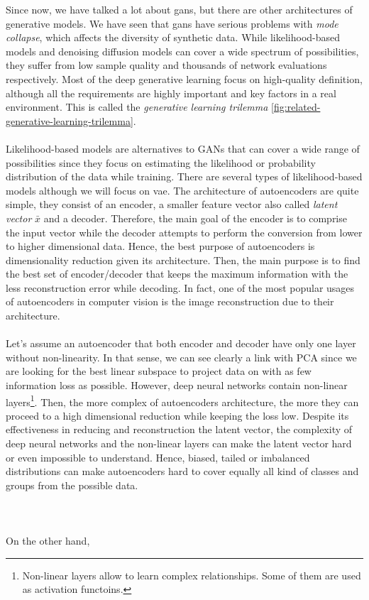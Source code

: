 \documentclass[11pt, a4paper]{article}
\begin{document}
	Since now, we have talked a lot about \gls{gan}s, but there are other architectures of generative models. We have seen that \gls{gan}s have serious problems with \textit{mode collapse}, which affects the diversity of synthetic data. While likelihood-based models and denoising diffusion models can cover a wide spectrum of possibilities, they suffer from low sample quality and thousands of network evaluations respectively. Most of the deep generative learning focus on high-quality definition, although all the requirements are highly important and key factors in a real environment. This is called the \textit{generative learning trilemma} \ref{fig:related-generative-learning-trilemma}.
	\\\\
	Likelihood-based models are alternatives to GANs that can cover a wide range of possibilities since they focus on estimating the likelihood or probability distribution of the data while training. There are several types of likelihood-based models although we will focus on \gls{vae}. The architecture of autoencoders are quite simple, they consist of an encoder, a smaller feature vector also called \textit{latent vector} $\bar{x}$ and a decoder. Therefore, the main goal of the encoder is to comprise the input vector while the decoder attempts to perform the conversion from lower to higher dimensional data. Hence, the best purpose of autoencoders is dimensionality reduction given its architecture. Then, the main purpose is to find the best set of encoder/decoder that keeps the maximum information with the less reconstruction error while decoding. In fact, one of the most popular usages of autoencoders in computer vision is the image reconstruction due to their architecture.
	\\\\
	Let's assume an autoencoder that both encoder and decoder have only one layer without non-linearity. In that sense, we can see clearly a link with PCA since we are looking for the best linear subspace to project data on with as few information loss as possible. However, deep neural networks contain non-linear layers\footnote{Non-linear layers allow to learn complex relationships. Some of them are used as activation functoins.}. Then, the more complex of autoencoders architecture, the more they can proceed to a high dimensional reduction while keeping the loss low. Despite its effectiveness in reducing and reconstruction the latent vector, the complexity of deep neural networks and the non-linear layers can make the latent vector hard or even impossible to understand.  Hence, biased, tailed or imbalanced distributions can make autoencoders hard to cover equally all kind of classes and groups from the possible data. 
	\\
	\\
	\\
	\\
	On the other hand, 
\end{document}
